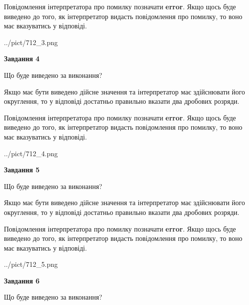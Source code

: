 \documentclass[12pt, ukrainian]{article}
\begin{document}
{\begin {Large}
Повідомлення інтерпретатора про помилку позначати \textbf{error}.
Якщо щось буде виведено до того, як інтерпретатор видасть повідомлення про помилку, 
то воно має вказуватись у відповіді. \par

\begin{center}
	{../pict/712_3.png}
\end{center}
\newpage

{\begin {center}\textbf{Завдання 4}\end {center}}\par
Що буде виведено за виконання? \par

Якщо має бути виведено дійсне значення та інтерпретатор має здійснювати його округлення, 
то у відповіді достатньо правильно вказати два дробових розряди.

Повідомлення інтерпретатора про помилку позначати \textbf{error}.
Якщо щось буде виведено до того, як інтерпретатор видасть повідомлення про помилку, 
то воно має вказуватись у відповіді. \par

\begin{center}
	{../pict/712_4.png}
\end{center}
\newpage

{\begin {center}\textbf{Завдання 5}\end {center}}\par
Що буде виведено за виконання? \par

Якщо має бути виведено дійсне значення та інтерпретатор має здійснювати його округлення, 
то у відповіді достатньо правильно вказати два дробових розряди.

Повідомлення інтерпретатора про помилку позначати \textbf{error}.
Якщо щось буде виведено до того, як інтерпретатор видасть повідомлення про помилку, 
то воно має вказуватись у відповіді. \par

\begin{center}
	{../pict/712_5.png}
\end{center}
\newpage

{\begin {center}\textbf{Завдання 6}\end {center}}\par
Що буде виведено за виконання? \par


\end{Large}}
\end{document}
